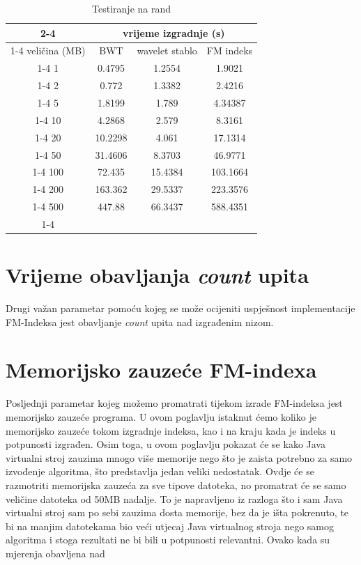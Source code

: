 \begin{table}[h]
\caption{Testiranje na rand}
\label{tbl:tablRand}
\centering
\begin{tabular}{c|c|c|c|}
\cline{2-4}
      	    					 & \multicolumn{3}{c|}{vrijeme izgradnje (s)}  \\ \cline{1-4}
\multicolumn{1}{ |c| } {veličina (MB)} & BWT & wavelet stablo & FM indeks  \\ \cline{1-4}  
\multicolumn{1}{ |c| } {   1    } 		& 	0.4795	&	1.2554	&	1.9021	\\ \cline{1-4}
\multicolumn{1}{ |c| } {   2    } 		& 	0.772	&	1.3382	&	2.4216	\\ \cline{1-4}
\multicolumn{1}{ |c| } {   5    } 		& 	1.8199	&	1.789	&	4.34387	\\ \cline{1-4}
\multicolumn{1}{ |c| } {   10    } 		&	4.2868	&	2.579	&	8.3161	\\ \cline{1-4}
\multicolumn{1}{ |c| } {   20    } 		&	10.2298	&	4.061	&	17.1314	\\ \cline{1-4}
\multicolumn{1}{ |c| } {   50    } 		&	31.4606	&	8.3703	&	46.9771	\\ \cline{1-4}
\multicolumn{1}{ |c| } {   100    } 		&	72.435	&	15.4384	&	103.1664	\\ \cline{1-4}
\multicolumn{1}{ |c| } {   200    } 		&	163.362	&	29.5337	&	223.3576	\\ \cline{1-4}
\multicolumn{1}{ |c| } {   500    } 		&	447.88	&	66.3437	&	588.4351	\\ \cline{1-4}
\end{tabular}
\end{table}






\section{Vrijeme obavljanja \textit{count} upita}

Drugi važan parametar pomoću kojeg se može ocijeniti uspješnost implementacije FM-Indeksa jest obavljanje \textit{count} upita nad izgrađenim nizom. 

\section{Memorijsko zauzeće FM-indexa}

Posljednji parametar kojeg možemo promatrati tijekom izrade FM-indeksa jest memorijsko zauzeće programa. U ovom poglavlju istaknut ćemo koliko je memorijsko zauzeće tokom izgradnje indeksa, kao i na kraju kada je indeks u potpunosti izgrađen. Osim toga, u ovom poglavlju pokazat će se kako Java virtualni stroj zauzima mnogo više memorije nego što je zaista potrebno za samo izvođenje algoritma, što predstavlja jedan veliki nedostatak. Ovdje će se razmotriti memorijska zauzeća za sve tipove datoteka, no promatrat će se samo veličine datoteka od 50MB nadalje. To je napravljeno iz razloga što i sam Java virtualni stroj sam po sebi zauzima dosta memorije, bez da je išta pokrenuto, te bi na manjim datotekama bio veći utjecaj Java virtualnog stroja nego samog algoritma i stoga rezultati ne bi bili u potpunosti relevantni. Ovako kada su mjerenja obavljena nad 


